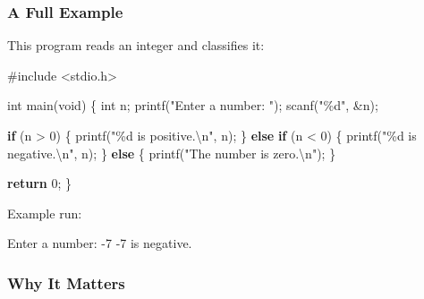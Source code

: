 \documentclass[
  letterpaper,
  DIV=11,
  numbers=noendperiod]{scrreprt}
\newenvironment{Shaded}{\begin{snugshade}}{\end{snugshade}}
\newcommand{\AttributeTok}[1]{\textcolor[rgb]{0.40,0.45,0.13}{#1}}
\newcommand{\ControlFlowTok}[1]{\textcolor[rgb]{0.00,0.23,0.31}{\textbf{#1}}}
\newcommand{\DataTypeTok}[1]{\textcolor[rgb]{0.68,0.00,0.00}{#1}}
\newcommand{\DecValTok}[1]{\textcolor[rgb]{0.68,0.00,0.00}{#1}}
\newcommand{\ExtensionTok}[1]{\textcolor[rgb]{0.00,0.23,0.31}{#1}}
\newcommand{\ImportTok}[1]{\textcolor[rgb]{0.00,0.46,0.62}{#1}}
\newcommand{\NormalTok}[1]{\textcolor[rgb]{0.00,0.23,0.31}{#1}}
\newcommand{\OperatorTok}[1]{\textcolor[rgb]{0.37,0.37,0.37}{#1}}
\newcommand{\PreprocessorTok}[1]{\textcolor[rgb]{0.68,0.00,0.00}{#1}}
\newcommand{\SpecialCharTok}[1]{\textcolor[rgb]{0.37,0.37,0.37}{#1}}
\newcommand{\StringTok}[1]{\textcolor[rgb]{0.13,0.47,0.30}{#1}}
\begin{document}
\subsubsection{A Full Example}\label{a-full-example-9}

This program reads an integer and classifies it:

\begin{Shaded}
\begin{Highlighting}[]
\PreprocessorTok{\#include }\ImportTok{\textless{}stdio.h\textgreater{}}

\DataTypeTok{int}\NormalTok{ main}\OperatorTok{(}\DataTypeTok{void}\OperatorTok{)} \OperatorTok{\{}
    \DataTypeTok{int}\NormalTok{ n}\OperatorTok{;}
\NormalTok{    printf}\OperatorTok{(}\StringTok{"Enter a number: "}\OperatorTok{);}
\NormalTok{    scanf}\OperatorTok{(}\StringTok{"}\SpecialCharTok{\%d}\StringTok{"}\OperatorTok{,} \OperatorTok{\&}\NormalTok{n}\OperatorTok{);}

    \ControlFlowTok{if} \OperatorTok{(}\NormalTok{n }\OperatorTok{\textgreater{}} \DecValTok{0}\OperatorTok{)} \OperatorTok{\{}
\NormalTok{        printf}\OperatorTok{(}\StringTok{"}\SpecialCharTok{\%d}\StringTok{ is positive.}\SpecialCharTok{\textbackslash{}n}\StringTok{"}\OperatorTok{,}\NormalTok{ n}\OperatorTok{);}
    \OperatorTok{\}} \ControlFlowTok{else} \ControlFlowTok{if} \OperatorTok{(}\NormalTok{n }\OperatorTok{\textless{}} \DecValTok{0}\OperatorTok{)} \OperatorTok{\{}
\NormalTok{        printf}\OperatorTok{(}\StringTok{"}\SpecialCharTok{\%d}\StringTok{ is negative.}\SpecialCharTok{\textbackslash{}n}\StringTok{"}\OperatorTok{,}\NormalTok{ n}\OperatorTok{);}
    \OperatorTok{\}} \ControlFlowTok{else} \OperatorTok{\{}
\NormalTok{        printf}\OperatorTok{(}\StringTok{"The number is zero.}\SpecialCharTok{\textbackslash{}n}\StringTok{"}\OperatorTok{);}
    \OperatorTok{\}}

    \ControlFlowTok{return} \DecValTok{0}\OperatorTok{;}
\OperatorTok{\}}
\end{Highlighting}
\end{Shaded}

Example run:

\begin{Shaded}
\begin{Highlighting}[]
\ExtensionTok{Enter}\NormalTok{ a number: }\AttributeTok{{-}7}
\ExtensionTok{{-}7}\NormalTok{ is negative.}
\end{Highlighting}
\end{Shaded}

\subsubsection{Why It Matters}\label{why-it-matters-14}
\end{document}
